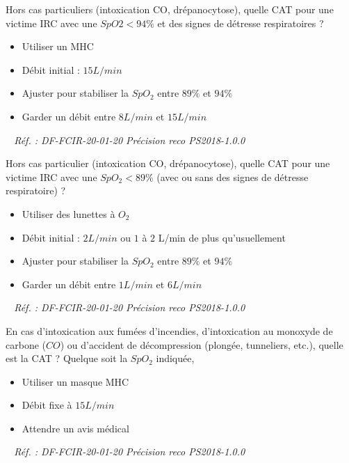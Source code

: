 \documentclass[grid,avery5371,landscape]{flashcards}
\makeatletter
\newcounter{nocarte}
\newcommand{\categ}[1]{%
  \def\@categ{#1}%
  \setcounter{nocarte}{0}%
}
\newcommand{\source}[1]{%
  \medskip
  \itshape%
   ~ \hfill Réf. : #1}
\makeatother
\begin{document}
\color[HTML]{003273}
\categ{PSE}
\begin{flashcard}[CAT]{
 Hors cas particuliers (intoxication CO, drépanocytose), quelle CAT pour une victime IRC avec une $SpO2<94\%$ et des signes de détresse respiratoires ?   }
  \begin{itemize}
       \item Utiliser un MHC
       \item Débit initial : $15L/min$
       \item Ajuster pour stabiliser la $SpO_2$ entre $89\%$ et $94\%$
       \item Garder un débit entre $8L/min$ et $15L/min$
   \end{itemize}
  \source{DF-FCIR-20-01-20 Précision reco PS2018-1.0.0}
\end{flashcard}


\color[HTML]{003273}
\categ{PSE}
\begin{flashcard}[CAT]{
 Hors cas particulier (intoxication CO, drépanocytose), quelle CAT pour une victime IRC avec une $SpO_2<89\%$ (avec ou sans des signes de détresse respiratoire) ?   }
  \begin{itemize}
       \item Utiliser des lunettes à $O_2$
       \item Débit initial : $2L/min$ ou $1$ à $2$ L/min de plus qu'usuellement
       \item Ajuster pour stabiliser la $SpO_2$ entre $89\%$ et $94\%$
       \item Garder un débit entre $1L/min$ et $6L/min$
   \end{itemize}
  \source{DF-FCIR-20-01-20 Précision reco PS2018-1.0.0}
\end{flashcard}


\color[HTML]{003273}
\categ{PSE}
\begin{flashcard}[CAT]{
    En cas d'intoxication aux fumées d'incendies, d'intoxication au monoxyde de carbone ($CO$) ou d'accident de décompression (plongée, tunneliers, etc.), quelle est la CAT ?   }
  Quelque soit la $SpO_2$ indiquée, 
   \begin{itemize}
       \item Utiliser un masque MHC
       \item Débit fixe à $15L/min$
       \item Attendre un avis médical
   \end{itemize}
  \source{DF-FCIR-20-01-20 Précision reco PS2018-1.0.0}
\end{flashcard}
\end{document}

